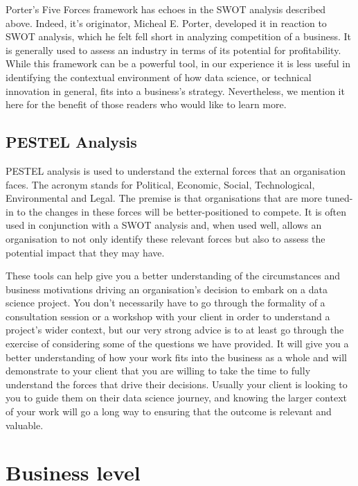 \documentclass[
]{book}
\begin{document}
Porter's Five Forces framework has echoes in the SWOT analysis described
above. Indeed, it's originator, Micheal E. Porter, developed it in
reaction to SWOT analysis, which he felt fell short in analyzing
competition of a business. It is generally used to assess an industry in
terms of its potential for profitability. While this framework can be a
powerful tool, in our experience it is less useful in identifying the
contextual environment of how data science, or technical innovation in
general, fits into a business's strategy. Nevertheless, we mention it
here for the benefit of those readers who would like to learn more.

\hypertarget{pestel-analysis}{%
\subsection{PESTEL Analysis}\label{pestel-analysis}}

PESTEL analysis is used to understand the external forces that an
organisation faces. The acronym stands for Political, Economic, Social,
Technological, Environmental and Legal. The premise is that
organisations that are more tuned-in to the changes in these forces will
be better-positioned to compete. It is often used in conjunction with a
SWOT analysis and, when used well, allows an organisation to not only
identify these relevant forces but also to assess the potential impact
that they may have.

These tools can help give you a better understanding of the
circumstances and business motivations driving an organisation's
decision to embark on a data science project. You don't necessarily have
to go through the formality of a consultation session or a workshop with
your client in order to understand a project's wider context, but our
very strong advice is to at least go through the exercise of considering
some of the questions we have provided. It will give you a better
understanding of how your work fits into the business as a whole and
will demonstrate to your client that you are willing to take the time to
fully understand the forces that drive their decisions. Usually your
client is looking to you to guide them on their data science journey,
and knowing the larger context of your work will go a long way to
ensuring that the outcome is relevant and valuable.

\hypertarget{business-level}{%
\section{Business level}\label{business-level}}
\end{document}
